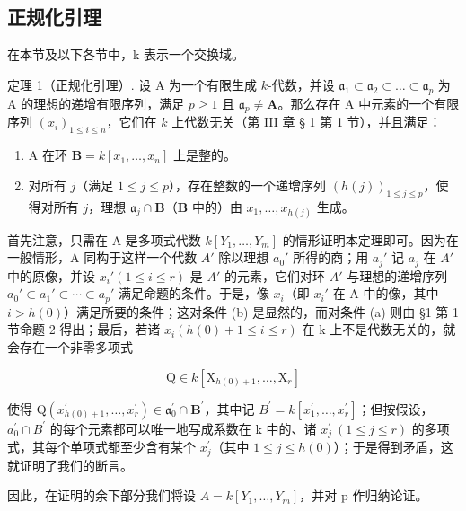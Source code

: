 \subsection{正规化引理}

在本节及以下各节中，k 表示一个交换域。

定理 1（正规化引理）. 设 A 为一个有限生成 \(k\)-代数，并设 \(\mathfrak{a}_1 \subset \mathfrak{a}_2 \subset \ldots \subset \mathfrak{a}_p\) 为 A 的理想的递增有限序列，满足 \(p \geqslant 1\) 且 \(\mathfrak{a}_p \neq \mathbf{A}\)。那么存在 A 中元素的一个有限序列 \((x_i)_{1 \leqslant i \leqslant n}\)，它们在 \(k\) 上代数无关（第 III 章 § 1 第 1 节），并且满足：

\begin{enumerate}
\def\labelenumi{(\alph{enumi})}
\item
  A 在环 \(\mathbf{B} = k[x_1, \ldots, x_n]\) 上是整的。
\item
  对所有 \(j\)（满足 \(1 \leqslant j \leqslant p\)），存在整数的一个递增序列 \((h(j))_{1 \leqslant j \leqslant p}\)，使得对所有 \(j\)，理想 \(\mathfrak{a}_j \cap \mathbf{B}\)（\(\mathbf{B}\) 中的）由 \(x_1, \ldots, x_{h(j)}\) 生成。
\end{enumerate}

首先注意，只需在 A 是多项式代数 \(k[Y_{1},\ldots,Y_{m}]\) 的情形证明本定理即可。因为在一般情形，A 同构于这样一个代数 \(A'\) 除以理想 \(a_{0}'\) 所得的商；用 \(a_{j}'\) 记 \(a_{j}\) 在 \(A'\) 中的原像，并设 \(x_{i}'(1\leqslant i\leqslant r)\) 是 \(A'\) 的元素，它们对环 \(A'\) 与理想的递增序列 \(a_{0}'\subset a_{1}'\subset\cdots\subset a_{p}'\) 满足命题的条件。于是，像 \(x_{i}\)（即 \(x_{i}'\) 在 A 中的像，其中 \(i>h(0)\)）满足所要的条件；这对条件 (b) 是显然的，而对条件 (a) 则由 §1 第 1 节命题 2 得出；最后，若诸 \(x_{i}(h(0)+1\leqslant i\leqslant r)\) 在 k 上不是代数无关的，就会存在一个非零多项式

\[
\mathrm{Q} \in k [ \mathrm{X} _ {h (0) + 1}, \dots , \mathrm{X} _ {r} ]
\]

使得 \(\mathrm{Q}(x_{h(0)+1}^{\prime},\ldots,x_{r}^{\prime})\in\mathfrak{a}_{0}^{\prime}\cap\mathbf{B}^{\prime}\)，其中记 \(B^{\prime}=k[x_{1}^{\prime},\ldots,x_{r}^{\prime}]\)；但按假设，\(a_{0}^{\prime}\cap B^{\prime}\) 的每个元素都可以唯一地写成系数在 k 中的、诸 \(x_{j}^{\prime}\ (1\leqslant j\leqslant r)\) 的多项式，其每个单项式都至少含有某个 \(x_{j}^{\prime}\)（其中 \(1\leqslant j\leqslant h(0)\)）；于是得到矛盾，这就证明了我们的断言。

因此，在证明的余下部分我们将设 \(A = k[Y_{1}, \ldots, Y_{m}]\)，并对 p 作归纳论证。

